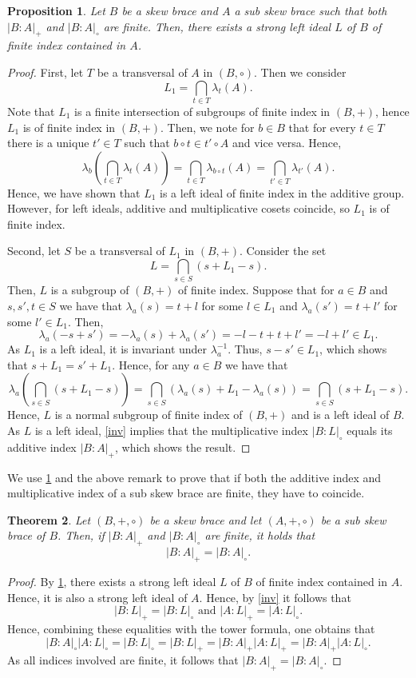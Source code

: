 \documentclass{amsart}
\newtheorem{thm}{Theorem}[section]
\newtheorem{pro}[thm]{Proposition}
\begin{document}
\begin{pro}\label{sli2}
    Let $B$ be a skew brace and $A$ a sub skew brace such that both $|B: A|_+$ and $|B:A|_{\circ}$ are finite. Then, there exists a strong left ideal $L$ of $B$ of finite index contained in $A$.
\end{pro}
\begin{proof}
    First, let $T$ be a transversal of $A$ in $(B,\circ)$. Then we consider $$ L_1 = \bigcap_{t \in T} \lambda_t(A).$$ Note that $L_1$ is a finite intersection of subgroups of finite index in $(B,+)$, hence $L_1$ is of finite index in $(B,+)$. Then, we note for $b \in B$ that for every $t\in T$ there is a unique $t' \in T$ such that $b \circ t \in t' \circ A$ and vice versa. Hence, $$ \lambda_b\left( \bigcap_{t \in T} \lambda_t(A)\right) = \bigcap_{t \in T} \lambda_{b \circ t}(A) = \bigcap_{t' \in T} \lambda_{t'}(A). $$ Hence, we have shown that $L_1$ is a left ideal of finite index in the additive group. 
    However, for left ideals, additive and multiplicative cosets coincide, so $L_1$ is of finite index.

    Second, let $S$ be a transversal of $L_1$ in $(B,+)$. Consider the set $$ L = \bigcap_{s \in S} (s+L_1-s).$$ Then, $L$ is a subgroup of $(B,+)$ of finite index. Suppose that for $a \in B$ and $s,s',t \in S$ we have that $\lambda_a(s) = t+l$ for some $l \in L_1$ and $\lambda_a(s') = t+l'$ for some $l' \in L_1$. Then, $$ \lambda_a(-s+s') = -\lambda_a(s)+\lambda_{a}(s') = -l-t+t+l' = -l+l' \in L_1.$$ As $L_1$ is a left ideal, it is invariant under $\lambda_a^{-1}$. Thus, $s-s' \in L_1$, which shows that $s+L_1=s'+L_1$. Hence, for any $a \in B$ we have that $$ \lambda_a\left(\bigcap_{s \in S} (s+L_1-s)\right) = \bigcap_{s \in S} (\lambda_a(s)+L_1-\lambda_a(s)) = \bigcap_{s \in S} (s+L_1-s).$$ Hence, $L$ is a normal subgroup of finite index of $(B,+)$ and is a left ideal of $B$. As $L$ is a left ideal, \cref{inv} implies that the multiplicative index $|B:L|_{\circ}$  equals its additive index $|B:A|_+$, which shows the result.
\end{proof}

We use \cref{sli2} and the above remark to prove that if both the additive index and multiplicative index of a sub skew brace are finite, they have to coincide. 
\begin{thm}\label{finiteisnice}
    Let $(B,+,\circ)$ be a skew brace and let $(A,+,\circ)$ be a sub skew brace of $B$. Then, if $|B:A|_+$ and $|B:A|_\circ$ are finite, it holds that $$|B:A|_+=|B:A|_\circ.$$
\end{thm}
\begin{proof}
    By \cref{sli2}, there exists a strong left ideal $L$ of $B$ of finite index contained in $A$. Hence, it is also a strong left ideal of $A$. Hence, by \cref{inv} it follows that $$ |B:L|_+= |B:L|_{\circ} \text{ and } |A:L|_+ = |A:L|_{\circ}.$$ Hence, combining these equalities with the tower formula, one obtains that $$ |B:A|_\circ|A:L|_{\circ}=|B:L|_{\circ}=|B:L|_+=|B:A|_+|A:L|_+=|B:A|_+|A:L|_{\circ}.$$ As all indices involved are finite, it follows that  $|B:A|_+=|B:A|_\circ$.
\end{proof}
\end{document}
